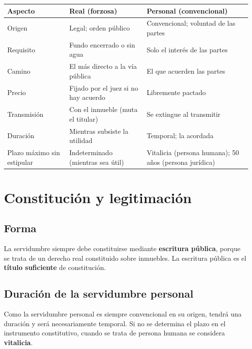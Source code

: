 \documentclass[12pt,oneside]{book}
\begin{document}
\begin{table}[H]
\centering
\small
\begin{tabularx}{\textwidth}{@{}>{\raggedright\arraybackslash}p{}>{\raggedright\arraybackslash}X>{\raggedright\arraybackslash}X@{}}
\toprule
\textbf{Aspecto} & \textbf{Real (forzosa)} & \textbf{Personal (convencional)} \\
\midrule
Origen & Legal; orden público & Convencional; voluntad de las partes \\
Requisito & Fundo encerrado o sin agua & Solo el interés de las partes \\
Camino & El más directo a la vía pública & El que acuerden las partes \\
Precio & Fijado por el juez si no hay acuerdo & Libremente pactado \\
Transmisión & Con el inmueble (muta el titular) & Se extingue al transmitir \\
Duración & Mientras subsiste la utilidad & Temporal; la acordada \\
Plazo máximo sin estipular & Indeterminado (mientras sea útil) & Vitalicia (persona humana); 50 años (persona jurídica) \\
\bottomrule
\end{tabularx}
\end{table}

\section{Constitución y legitimación}

\subsection{Forma}

La servidumbre siempre debe constituirse mediante \textbf{escritura pública}, porque se trata de un derecho real constituido sobre inmuebles. La escritura pública es el \textbf{título suficiente} de constitución.

\subsection{Duración de la servidumbre personal}

Como la servidumbre personal es siempre convencional en su origen, tendrá una duración y será necesariamente temporal. Si no se determina el plazo en el instrumento constitutivo, cuando se trata de persona humana se considera \textbf{vitalicia}.
\end{document}

